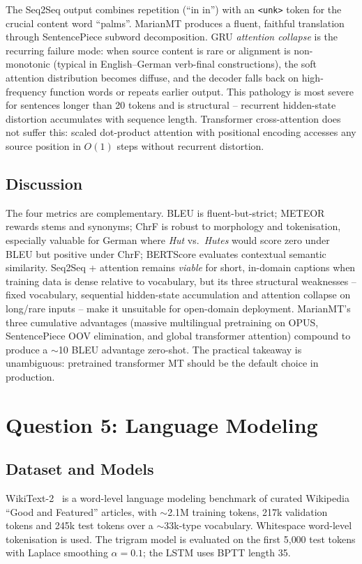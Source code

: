 \documentclass[11pt,a4paper]{article}
\begin{document}
The Seq2Seq output combines repetition (``in in'') with an \texttt{<unk>} token for the crucial content word ``palms''. MarianMT produces a fluent, faithful translation through SentencePiece subword decomposition. GRU \emph{attention collapse} is the recurring failure mode: when source content is rare or alignment is non-monotonic (typical in English--German verb-final constructions), the soft attention distribution becomes diffuse, and the decoder falls back on high-frequency function words or repeats earlier output. This pathology is most severe for sentences longer than 20 tokens and is structural -- recurrent hidden-state distortion accumulates with sequence length. Transformer cross-attention does not suffer this: scaled dot-product attention with positional encoding accesses any source position in $O(1)$ steps without recurrent distortion.

\subsection{Discussion}
The four metrics are complementary. BLEU is fluent-but-strict; METEOR rewards stems and synonyms; ChrF is robust to morphology and tokenisation, especially valuable for German where \emph{Hut} vs.\ \emph{Hutes} would score zero under BLEU but positive under ChrF; BERTScore evaluates contextual semantic similarity. Seq2Seq + attention remains \emph{viable} for short, in-domain captions when training data is dense relative to vocabulary, but its three structural weaknesses -- fixed vocabulary, sequential hidden-state accumulation and attention collapse on long/rare inputs -- make it unsuitable for open-domain deployment. MarianMT's three cumulative advantages (massive multilingual pretraining on OPUS, SentencePiece OOV elimination, and global transformer attention) compound to produce a $\sim$10 BLEU advantage zero-shot. The practical takeaway is unambiguous: pretrained transformer MT should be the default choice in production.

\section{Question 5: Language Modeling}

\subsection{Dataset and Models}
WikiText-2~\cite{merity2017pointer} is a word-level language modeling benchmark of curated Wikipedia ``Good and Featured'' articles, with $\sim$2.1M training tokens, 217k validation tokens and 245k test tokens over a $\sim$33k-type vocabulary. Whitespace word-level tokenisation is used. The trigram model is evaluated on the first 5{,}000 test tokens with Laplace smoothing $\alpha{=}0.1$; the LSTM uses BPTT length 35.
\end{document}
